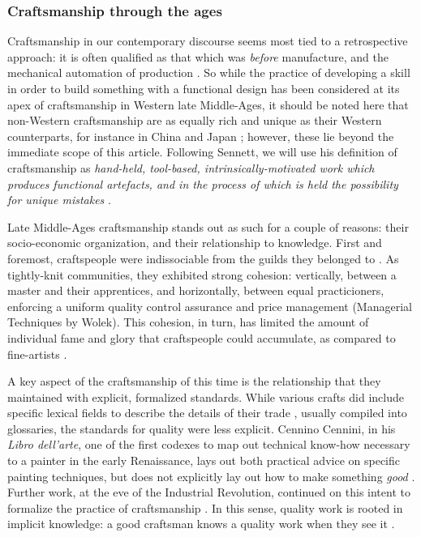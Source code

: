 \subsubsection{Craftsmanship through the ages}

Craftsmanship in our contemporary discourse seems most tied to a retrospective approach: it is often qualified as that which was \emph{before} manufacture, and the mechanical automation of production \citep{thompson_study_1934}. So while the practice of developing a skill in order to build something with a functional design has been considered at its apex of craftsmanship in Western late Middle-Ages, it should be noted here that non-Western craftsmanship are as equally rich and unique as their Western counterparts, for instance in China \citep{zhang_jingdezhen_2015} and Japan \citep{jordan_copying_2003}; however, these lie beyond the immediate scope of this article. Following Sennett, we will use his definition of craftsmanship as \emph{hand-held, tool-based, intrinsically-motivated work which produces functional artefacts, and in the process of which is held the possibility for unique mistakes} \citep{sennett_craftsman_2009}.

Late Middle-Ages craftsmanship stands out as such for a couple of reasons: their socio-economic organization, and their relationship to knowledge. First and foremost, craftspeople were indissociable from the guilds they belonged to \citep{black_guilds_1984}. As tightly-knit communities, they exhibited strong cohesion: vertically, between a master and their apprentices, and horizontally, between equal practicioners, enforcing a uniform quality control assurance and price management (Managerial Techniques by Wolek). This cohesion, in turn, has limited the amount of individual fame and glory that craftspeople could accumulate, as compared to fine-artists \citep{thompson_materials_1956}.

A key aspect of the craftsmanship of this time is the relationship that they maintained with explicit, formalized standards. While various crafts did include specific lexical fields to describe the details of their trade \citep{bassett_craftsman_2008}, usually compiled into glossaries, the standards for quality were less explicit. Cennino Cennini, in his \emph{Libro dell'arte}, one of the first codexes to map out technical know-how necessary to a painter in the early Renaissance, lays out both practical advice on specific painting techniques, but does not explicitly lay out how to make something \emph{good} \citep{cennini_craftsman_2012}. Further work, at the eve of the Industrial Revolution, continued on this intent to formalize the practice of craftsmanship \citep{pannabecker_diderot_1994}. In this sense, quality work is rooted in implicit knowledge: a good craftsman knows a quality work when they see it \citep{sennett_craftsman_2009}.

